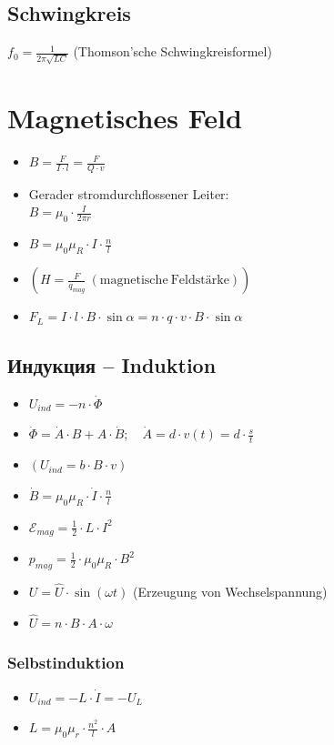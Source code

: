 \documentclass[paper = a4, twocolumn]{scrartcl}
\DeclareRobustCommand{\E}{\mathcal{E}}
\begin{document}
\subsection{Schwingkreis}
\( f_0 = \frac{1}{2 \pi \sqrt{LC}} \) (Thomson’sche Schwingkreisformel)

\section{Magnetisches Feld}
\begin{itemize}
\item
	\( B = \frac{F}{I \cdot l} = \frac{F}{Q \cdot v} \)
\item
	Gerader stromdurchflossener Leiter:\\
	\( B = \mu_0 \cdot \frac{I}{2 \pi r} \)
\item
	\( B = \mu_0 \mu_R \cdot I \cdot \frac{n}{l} \)
\item
	\( \left( H = \frac{F}{q_{mag}}\ \mathrm{(magnetische\ Feldstärke)} \right)
	\)
\item
	\( F_L = I \cdot l \cdot B \cdot \sin \alpha = n \cdot q \cdot v \cdot B
	\cdot \sin \alpha \)
\end{itemize}

\subsection{Индукция -- Induktion}
\begin{itemize}
\item
	\( U_{ind} = -n \cdot \dot{\Phi} \)
\item
	\( \dot{\Phi} = \dot{A} \cdot B + A \cdot \dot{B}; \quad \dot{A} = d \cdot
	v(t) = d \cdot \frac{s}{t} \)
\item
	\(\left(  U_{ind} = b \cdot B \cdot v \right)\)
\item
	\( \dot{B} = \mu_0 \mu_R \cdot \dot{I} \cdot \frac{n}{l} \)
\item
	\( \E_{mag} = \frac{1}{2} \cdot L \cdot I^2 \)
\item
	\( p_{mag} = \frac{1}{2} \cdot \mu_0 \mu_R \cdot B^2 \)
\item
	\( U = \hat{U} \cdot \sin(\omega t) \) (Erzeugung von Wechselspannung)
\item
	\( \hat{U} = n \cdot B \cdot A \cdot \omega \)
\end{itemize}

\subsubsection{Selbstinduktion}
\begin{itemize}
\item
	\( U_{ind} = -L \cdot \dot{I} = -U_L \)
\item
	\( L = \mu_0 \mu_r \cdot \frac{n^2}{l} \cdot A \)
\end{itemize}
\end{document}
